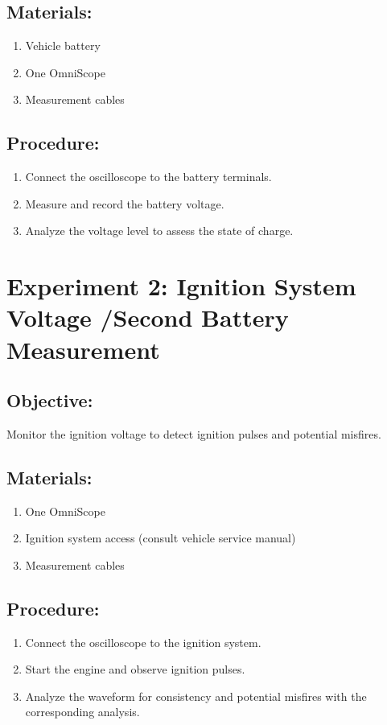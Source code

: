 \documentclass[]{scrreprt}
\begin{document}
    \subsection*{Materials:}
    \begin{enumerate}
        \item Vehicle battery
        \item One OmniScope
        \item Measurement cables
    \end{enumerate}
    \subsection*{Procedure:}
    \begin{enumerate}
        \item Connect the oscilloscope to the battery terminals.
        \item Measure and record the battery voltage.
        \item Analyze the voltage level to assess the state of charge.
    \end{enumerate}

    \section*{Experiment 2: Ignition System Voltage /Second Battery Measurement}
    \subsection*{Objective:} Monitor the ignition voltage to detect ignition pulses and potential misfires.
    \subsection*{Materials:}
    \begin{enumerate}
        \item One OmniScope
        \item Ignition system access (consult vehicle service manual)
        \item Measurement cables
    \end{enumerate}
    \subsection*{Procedure:}
    \begin{enumerate}
        \item Connect the oscilloscope to the ignition system.
        \item Start the engine and observe ignition pulses.
        \item Analyze the waveform for consistency and potential misfires with the corresponding analysis.
    \end{enumerate}
\end{document}
